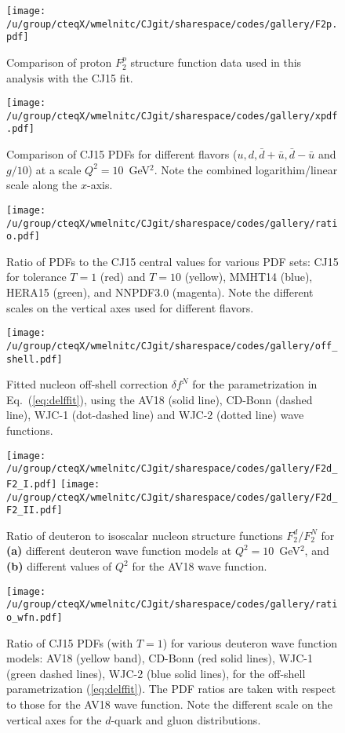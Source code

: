 \documentclass[aps,prd,amsmath,preprint]{revtex4}
\begin{document}
\newpage
\begin{figure}[t]
\texttt{[image: /u/group/cteqX/wmelnitc/CJgit/sharespace/codes/gallery/F2p.pdf]}
\caption{Comparison of proton $F_2^p$ structure function data
	used in this analysis with the CJ15 fit.}
\label{fig:F2p}
\end{figure} 


\begin{figure}[t]
\texttt{[image: /u/group/cteqX/wmelnitc/CJgit/sharespace/codes/gallery/xpdf.pdf]}
\caption{Comparison of CJ15 PDFs for different flavors
	($u, d, \bar d + \bar u, \bar d - \bar u$ and $g/10$)
	at a scale $Q^2=10$~GeV$^2$.
	Note the combined logarithim/linear scale along the $x$-axis.}
\label{fig:pdf}
\end{figure} 


\begin{figure}[t]
\texttt{[image: /u/group/cteqX/wmelnitc/CJgit/sharespace/codes/gallery/ratio.pdf]}
\caption{Ratio of PDFs to the CJ15 central values for various PDF sets:
	CJ15 for tolerance $T=1$ (red) and $T=10$ (yellow),
	MMHT14 \cite{MMHT14} (blue),
	HERA15 \cite{HERA15} (green), and
	NNPDF3.0 \cite{NNPDF3.0} (magenta).
	Note the different scales on the vertical axes used for
	different flavors.}
\label{fig:ratio_other}
\end{figure} 


\begin{figure}[t]
\texttt{[image: /u/group/cteqX/wmelnitc/CJgit/sharespace/codes/gallery/off\_shell.pdf]}
\caption{Fitted nucleon off-shell correction $\delta f^N$ for the
	parametrization in Eq.~(\ref{eq:delffit}), using the
	AV18 (solid line), CD-Bonn (dashed line), WJC-1 (dot-dashed line)
	and WJC-2 (dotted line) wave functions.}
\label{fig:off_shell}
\end{figure} 


\begin{figure}[t]
\texttt{[image: /u/group/cteqX/wmelnitc/CJgit/sharespace/codes/gallery/F2d\_F2\_I.pdf]}
\texttt{[image: /u/group/cteqX/wmelnitc/CJgit/sharespace/codes/gallery/F2d\_F2\_II.pdf]}
\caption{Ratio of deuteron to isoscalar nucleon structure functions
	$F_2^d/F_2^N$ for
	{\bf (a)} different deuteron wave function models
		at $Q^2=10$~GeV$^2$, and
	{\bf (b)} different values of $Q^2$ for the AV18 wave function.}
\label{fig:F2dN}
\end{figure} 


\begin{figure}[t]
\texttt{[image: /u/group/cteqX/wmelnitc/CJgit/sharespace/codes/gallery/ratio\_wfn.pdf]}
\caption{Ratio of CJ15 PDFs (with $T=1$) for various deuteron
	wave function models:
	AV18 (yellow band),
	CD-Bonn (red solid lines),
	WJC-1 (green dashed lines),
	WJC-2 (blue solid lines),
	for the off-shell parametrization (\ref{eq:delffit}).
	The PDF ratios are taken with respect to those for the
	AV18 wave function.
	Note the different scale on the vertical axes for the
	$d$-quark and gluon distributions.}
\label{fig:ratio_wfn}
\end{figure} 
\end{document}
